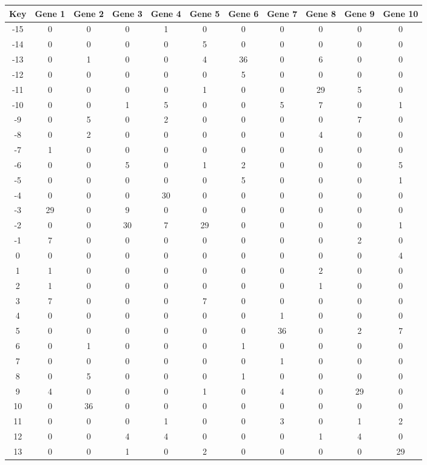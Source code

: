 \begin{tabular}{|c|c|c|c|c|c|c|c|c|c|c|}
\hline
Key & Gene 1 & Gene 2 & Gene 3 & Gene 4 & Gene 5 & Gene 6 & Gene 7 & Gene 8 & Gene 9 & Gene 10 \\
\hline
-15 & 0 & 0 & 0 & 1 & 0 & 0 & 0 & 0 & 0 & 0 \\
-14 & 0 & 0 & 0 & 0 & 5 & 0 & 0 & 0 & 0 & 0 \\
-13 & 0 & 1 & 0 & 0 & 4 & 36 & 0 & 6 & 0 & 0 \\
-12 & 0 & 0 & 0 & 0 & 0 & 5 & 0 & 0 & 0 & 0 \\
-11 & 0 & 0 & 0 & 0 & 1 & 0 & 0 & 29 & 5 & 0 \\
-10 & 0 & 0 & 1 & 5 & 0 & 0 & 5 & 7 & 0 & 1 \\
-9 & 0 & 5 & 0 & 2 & 0 & 0 & 0 & 0 & 7 & 0 \\
-8 & 0 & 2 & 0 & 0 & 0 & 0 & 0 & 4 & 0 & 0 \\
-7 & 1 & 0 & 0 & 0 & 0 & 0 & 0 & 0 & 0 & 0 \\
-6 & 0 & 0 & 5 & 0 & 1 & 2 & 0 & 0 & 0 & 5 \\
-5 & 0 & 0 & 0 & 0 & 0 & 5 & 0 & 0 & 0 & 1 \\
-4 & 0 & 0 & 0 & 30 & 0 & 0 & 0 & 0 & 0 & 0 \\
-3 & 29 & 0 & 9 & 0 & 0 & 0 & 0 & 0 & 0 & 0 \\
-2 & 0 & 0 & 30 & 7 & 29 & 0 & 0 & 0 & 0 & 1 \\
-1 & 7 & 0 & 0 & 0 & 0 & 0 & 0 & 0 & 2 & 0 \\
0 & 0 & 0 & 0 & 0 & 0 & 0 & 0 & 0 & 0 & 4 \\
1 & 1 & 0 & 0 & 0 & 0 & 0 & 0 & 2 & 0 & 0 \\
2 & 1 & 0 & 0 & 0 & 0 & 0 & 0 & 1 & 0 & 0 \\
3 & 7 & 0 & 0 & 0 & 7 & 0 & 0 & 0 & 0 & 0 \\
4 & 0 & 0 & 0 & 0 & 0 & 0 & 1 & 0 & 0 & 0 \\
5 & 0 & 0 & 0 & 0 & 0 & 0 & 36 & 0 & 2 & 7 \\
6 & 0 & 1 & 0 & 0 & 0 & 1 & 0 & 0 & 0 & 0 \\
7 & 0 & 0 & 0 & 0 & 0 & 0 & 1 & 0 & 0 & 0 \\
8 & 0 & 5 & 0 & 0 & 0 & 1 & 0 & 0 & 0 & 0 \\
9 & 4 & 0 & 0 & 0 & 1 & 0 & 4 & 0 & 29 & 0 \\
10 & 0 & 36 & 0 & 0 & 0 & 0 & 0 & 0 & 0 & 0 \\
11 & 0 & 0 & 0 & 1 & 0 & 0 & 3 & 0 & 1 & 2 \\
12 & 0 & 0 & 4 & 4 & 0 & 0 & 0 & 1 & 4 & 0 \\
13 & 0 & 0 & 1 & 0 & 2 & 0 & 0 & 0 & 0 & 29 \\
\hline
\end{tabular}